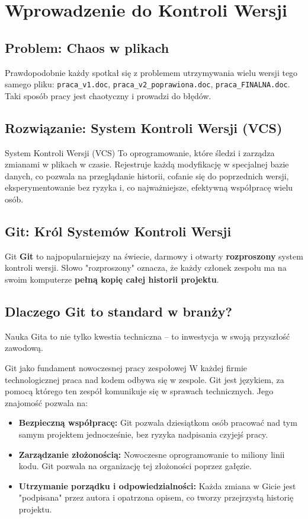 \section{Wprowadzenie do Kontroli Wersji}
\subsection{Problem: Chaos w plikach}
Prawdopodobnie każdy spotkał się z problemem utrzymywania wielu wersji tego samego pliku: \texttt{praca\_v1.doc}, \texttt{praca\_v2\_poprawiona.doc}, \texttt{praca\_FINALNA.doc}. Taki sposób pracy jest chaotyczny i prowadzi do błędów.

\subsection{Rozwiązanie: System Kontroli Wersji (VCS)}
\begin{definitionbox}{System Kontroli Wersji (VCS)}
To oprogramowanie, które śledzi i zarządza zmianami w plikach w czasie. Rejestruje każdą modyfikację w specjalnej bazie danych, co pozwala na przeglądanie historii, cofanie się do poprzednich wersji, eksperymentowanie bez ryzyka i, co najważniejsze, efektywną współpracę wielu osób.
\end{definitionbox}

\subsection{Git: Król Systemów Kontroli Wersji}
\begin{definitionbox}{Git}
\textbf{Git} to najpopularniejszy na świecie, darmowy i otwarty \textbf{rozproszony} system kontroli wersji. Słowo "rozproszony" oznacza, że każdy członek zespołu ma na swoim komputerze \textbf{pełną kopię całej historii projektu}.
\end{definitionbox}

\subsection{Dlaczego Git to standard w branży?}
Nauka Gita to nie tylko kwestia techniczna -- to inwestycja w swoją przyszłość zawodową.
\begin{importantbox}{Git jako fundament nowoczesnej pracy zespołowej}
W każdej firmie technologicznej praca nad kodem odbywa się w zespole. Git jest językiem, za pomocą którego ten zespół komunikuje się w sprawach technicznych. Jego znajomość pozwala na:
\begin{itemize}
    \item \textbf{Bezpieczną współpracę:} Git pozwala dziesiątkom osób pracować nad tym samym projektem jednocześnie, bez ryzyka nadpisania czyjejś pracy.
    \item \textbf{Zarządzanie złożonością:} Nowoczesne oprogramowanie to miliony linii kodu. Git pozwala na organizację tej złożoności poprzez gałęzie.
    \item \textbf{Utrzymanie porządku i odpowiedzialności:} Każda zmiana w Gicie jest "podpisana" przez autora i opatrzona opisem, co tworzy przejrzystą historię projektu.
\end{itemize}
\end{importantbox}


